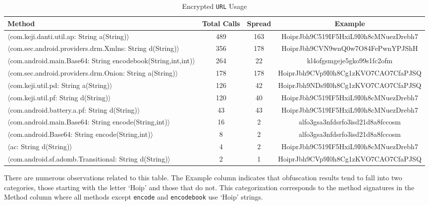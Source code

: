 \begin{table*}[t]
  \begin{center}
    {\small
\begin{tabular}{|l|c|c|c|}
\hline
\bf{Method}	& \bf{Total Calls} & \bf{Spread} & \bf{Example} \\
\hline
$\langle$com.keji.danti.util.ap: String a(String)$\rangle$                    & 489 & 163 & HoiprJbh9C519IF5HxiL9I0h8cMNuezDrebh7  \\
$\langle$com.sec.android.providers.drm.Xmlns: String d(String)$\rangle$        & 356 & 178 & HoiprJbh9CVN9wnQ0w7O84FePwnYPJShH  \\
$\langle$com.android.main.Base64: String encodebook(String,int,int)$\rangle$   &	264 & 22  & kl4ofgsmgeje5gko99s1fc2ofm  \\
$\langle$com.sec.android.providers.drm.Onion: String a(String)$\rangle$ 	      & 178 & 178 & HoiprJbh9CVp9I0h8Cg1zKVO7CAO7CfaPJSQ  \\
$\langle$com.keji.util.pd: String a(String)$\rangle$ 	                      & 126 & 42  & HoiprJbh9NDs9I0h8Cg1zKVO7CAO7CfaPJSQ  \\
$\langle$com.keji.util.pf: String d(String)$\rangle$ 	                      & 120 & 40  & HoiprJbh9C519IF5HxiL9I0h8cMNuezDrebh7  \\
$\langle$com.android.battery.a.pf: String d(String)$\rangle$ 	              & 43  & 43  & HoiprJbh9C519IF5HxiL9I0h8cMNuezDrebh7  \\
$\langle$com.android.main.Base64: String encode(String,int)$\rangle$ 	      & 16  & 2   & alfo3gsa3nfdsrfo3isd21d8a8fccosm  \\
$\langle$com.android.Base64: String encode(String,int)$\rangle$      	      & 8   & 2   & alfo3gsa3nfdsrfo3isd21d8a8fccosm  \\
$\langle$ac: String d(String)$\rangle$ 	                                      & 4   & 2   & HoiprJbh9C519IF5HxiL9I0h8cMNuezDrebh7  \\
$\langle$com.android.sf.adomb.Transitional: String d(String)$\rangle$          & 2   & 1   & HoiprJbh9CVp9I0h8Cg1zKVO7CAO7CfaPJSQ  \\
\hline
\end{tabular}
}
\vspace{.1in}
    \caption{Encrypted \texttt{URL} Usage}
    \label{table:enc}
  \end{center}
\end{table*}


There are numerous observations related to this table.  The Example column
indicates that obfuscation results tend to fall into two categories, those
starting with the letter `Hoip' and those that do not.  This categorization
corresponds to the method signatures in the Method column where all methods
except \texttt{encode} and \texttt{encodebook} use `Hoip' strings.

